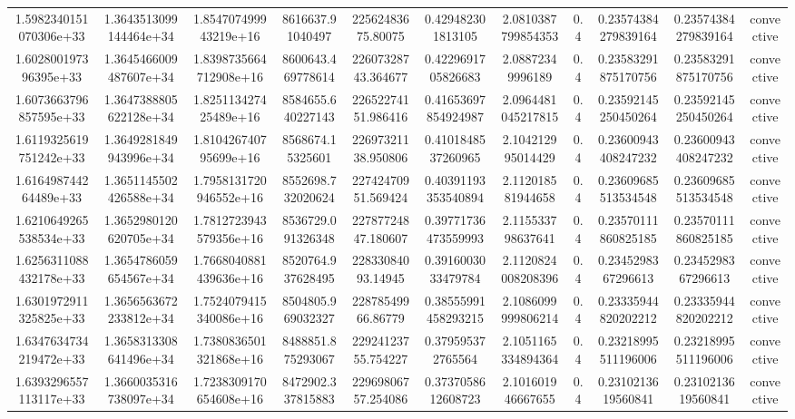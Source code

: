 \begin{table}
\begin{tabular}{ccccccccccc}
1.5982340151070306e+33 & 1.3643513099144464e+34 & 1.854707499943219e+16 & 8616637.91040497 & 22562483675.80075 & 0.429482301813105 & 2.0810387799854353 & 0.4 & 0.23574384279839164 & 0.23574384279839164 & convective \\
1.602800197396395e+33 & 1.3645466009487607e+34 & 1.8398735664712908e+16 & 8600643.469778614 & 22607328743.364677 & 0.4229691705826683 & 2.08872349996189 & 0.4 & 0.23583291875170756 & 0.23583291875170756 & convective \\
1.6073663796857595e+33 & 1.3647388805622128e+34 & 1.825113427425489e+16 & 8584655.640227143 & 22652274151.986416 & 0.41653697854924987 & 2.0964481045217815 & 0.4 & 0.23592145250450264 & 0.23592145250450264 & convective \\
1.6119325619751242e+33 & 1.3649281849943996e+34 & 1.810426740795699e+16 & 8568674.15325601 & 22697321138.950806 & 0.4101848537260965 & 2.104212995014429 & 0.4 & 0.23600943408247232 & 0.23600943408247232 & convective \\
1.616498744264489e+33 & 1.3651145502426588e+34 & 1.7958131720946552e+16 & 8552698.732020624 & 22742470951.569424 & 0.40391193353540894 & 2.112018581944658 & 0.4 & 0.23609685513534548 & 0.23609685513534548 & convective \\
1.6210649265538534e+33 & 1.3652980120620705e+34 & 1.7812723943579356e+16 & 8536729.091326348 & 22787724847.180607 & 0.39771736473559993 & 2.115533798637641 & 0.4 & 0.23570111860825185 & 0.23570111860825185 & convective \\
1.6256311088432178e+33 & 1.3654786059654567e+34 & 1.7668040881439636e+16 & 8520764.937628495 & 22833084093.14945 & 0.3916003033479784 & 2.1120824008208396 & 0.4 & 0.2345298367296613 & 0.2345298367296613 & convective \\
1.6301972911325825e+33 & 1.3656563672233812e+34 & 1.7524079415340086e+16 & 8504805.969032327 & 22878549966.86779 & 0.38555991458293215 & 2.1086099999806214 & 0.4 & 0.23335944820202212 & 0.23335944820202212 & convective \\
1.6347634734219472e+33 & 1.3658313308641496e+34 & 1.7380836501321868e+16 & 8488851.875293067 & 22924123755.754227 & 0.379595372765564 & 2.1051165334894364 & 0.4 & 0.23218995511196006 & 0.23218995511196006 & convective \\
1.6393296557113117e+33 & 1.3660035316738097e+34 & 1.7238309170654608e+16 & 8472902.337815883 & 22969806757.254086 & 0.3737058612608723 & 2.101601946667655 & 0.4 & 0.2310213619560841 & 0.2310213619560841 & convective \\

\end{tabular}
\end{table}
